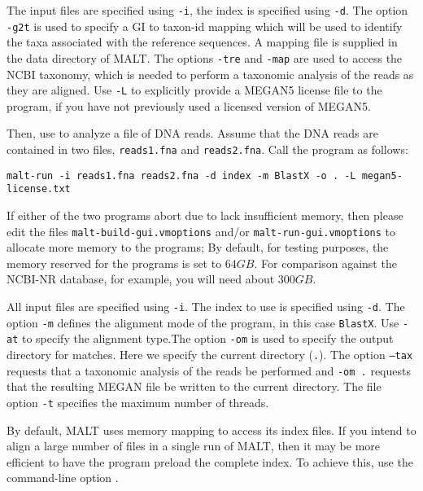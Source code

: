 \documentclass[11pt]{article}
\newcommand\MALT{{\sf MALT}\xspace}
\begin{document}
The input files are specified using {\tt -i}, the index is specified using {\tt -d}. 
The option {\tt -g2t} is used to specify a GI to taxon-id mapping which will be used to identify the taxa associated with
the reference sequences. A mapping file is supplied in the data directory of \MALT.
The options {\tt -tre} and {\tt -map} are used to access the NCBI taxonomy, which is needed to perform a taxonomic analysis of the reads as they are aligned. Use {\tt -L} to explicitly provide a MEGAN5 license file to the program, if you have not previously used a licensed version of MEGAN5.

Then, use  to analyze a file of DNA reads. Assume that the DNA reads are
contained in two files, {\tt reads1.fna} and {\tt reads2.fna}. Call the program as follows:
{\footnotesize
\begin{verbatim}
malt-run -i reads1.fna reads2.fna -d index -m BlastX -o . -L megan5-license.txt
\end{verbatim}
}

If either of the two programs abort due to lack insufficient memory, then please edit the files {\tt malt-build-gui.vmoptions} and/or {\tt malt-run-gui.vmoptions} to allocate more memory to the programs;
By default, for testing purposes, the memory reserved for the programs is set to $64GB$. 
For comparison against the NCBI-NR database, for example, you will  need about $300GB$.

All input files are specified using {\tt -i}.  The index to use is specified using {\tt -d}. The option {\tt -m} defines the alignment mode of the program, in this
case {\tt BlastX}. Use {\tt -at} to specify the alignment type.The option {\tt -om} is used to specify the output directory for matches.
Here we specify the current directory ({\tt .}). The option {\tt --tax} requests that a taxonomic analysis of the reads be performed and {\tt -om .}
requests that the resulting MEGAN file be written to the current directory.
The file option {\tt -t} specifies the maximum number of threads.

By default, \MALT uses memory mapping to access its index files. If you intend to align a large number of files in a single run of \MALT,
then it may be more efficient to have the program preload the complete index. To achieve this, use the command-line option .


\end{document}
